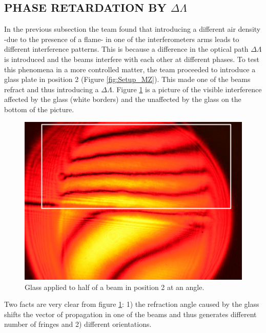 \subsection{PHASE RETARDATION BY $\Delta \Lambda$}
In the previous subsection the team found that introducing a different air density -due to the presence of a flame- in one of the interferometers arms leads to different interference patterns. This is because a difference in the optical path $\Delta \Lambda$ is introduced and the beams interfere with each other at different phases. To test this phenomena in a more controlled matter, the team proceeded to introduce a glass plate in position 2 (Figure \ref{fig:Setup_MZ}). This made one of the beams refract and thus introducing a $\Delta \Lambda$. Figure \ref{fig:GlassSetup} is a picture of the visible interference affected by the glass (white borders) and the unaffected by the glass on the bottom of the picture.
\begin{figure}[H]
    \centering
    \includegraphics[scale=0.20]{Figures/Figures_I/GlassOneArm_MZ.png}
    \caption{Glass applied to half of a beam in position 2 at an angle.}
    \label{fig:GlassSetup}
\end{figure}
Two facts are very clear from figure \ref{fig:GlassSetup}: 1) the refraction angle caused by the glass shifts the vector of propagation in one of the beams and thus generates different number of fringes and 2) different orientations. 

